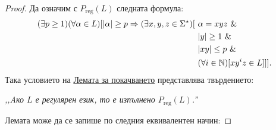 \begin{proof}
  Да означим с $P_{\text{reg}}(L)$ следната формула:
  \begin{align*}
    (\exists p \geq 1)(\forall \alpha \in L)[\lvert{\alpha}\rvert \geq p \Rightarrow (\exists x,y,z\in\Sigma^\star)[\ & \alpha = xyz\ \& \\
                                                                                                              & \lvert{y}\rvert \geq 1\ \&\\
                                                                                                              & \lvert{xy}\rvert \leq p\ \&\\
                                                                                                              & (\forall i\in\mathbb{N})[xy^iz \in L]]].
  \end{align*}
  Така условието на \hyperref[lem:pumping-reg]{Лемата за покачването} представлява твърдението:
  \begin{center}
    {\em ,,Aко $L$ е регулярен език, то е изпълнено $P_{\text{reg}}(L)$.''}
  \end{center}
  \noindent
  Лемата може да се запише по следния еквивалентен начин:
  

\end{proof}
